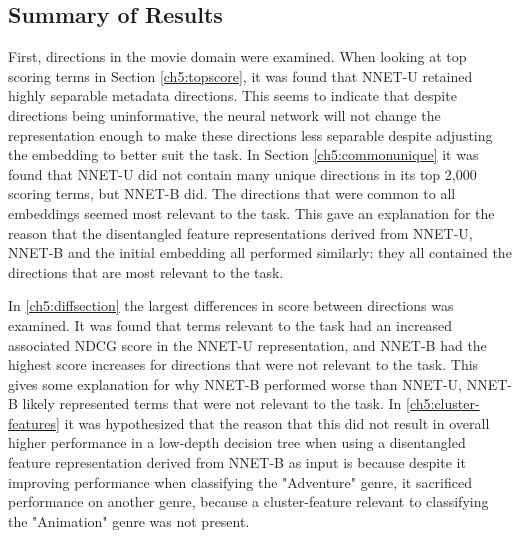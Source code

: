 













\subsection{Summary of Results}

First, directions in the movie domain were examined. When looking at top scoring terms in Section \ref{ch5:topscore}, it was found that NNET-U retained highly separable metadata directions. This seems to indicate that despite directions being uninformative, the neural network will not change the representation enough to make these directions less separable despite adjusting the embedding to better suit the task. In Section \ref{ch5:commonunique} it was found that NNET-U did not contain many unique directions in its top 2,000 scoring terms, but NNET-B did. The directions that were common to all embeddings seemed most relevant to the task. This  gave an explanation for the reason that the disentangled feature representations derived from NNET-U, NNET-B and the initial embedding all performed similarly:  they all contained the directions that are most relevant to the task. 

In \ref{ch5:diffsection} the largest differences in score between directions was examined. It was found that terms relevant to the task had an increased associated NDCG score in the NNET-U representation, and NNET-B had the highest score increases for directions that were not relevant to the task. This gives some explanation for why NNET-B performed worse than NNET-U, NNET-B likely represented terms that were not relevant to the task. In \ref{ch5:cluster-features} it was hypothesized that the reason that this did not result in overall higher performance  in a low-depth decision tree when using a disentangled feature representation derived from NNET-B as input is because despite it improving performance when classifying the "Adventure" genre, it sacrificed performance on another genre, because a cluster-feature relevant to classifying the "Animation" genre was not present.  

